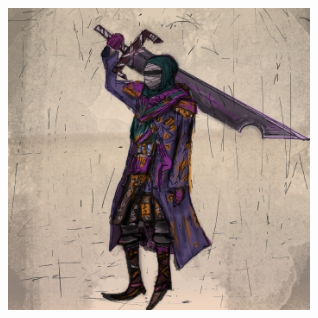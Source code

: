 \begin{center}
\includegraphics[width=80mm]{./content/img/otoria1.png}
\begin{figure}[h]
\end{figure}
\end{center}